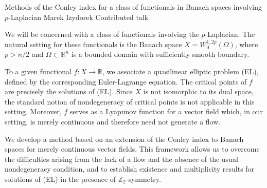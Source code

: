 \abstractheading
  {Methods of the Conley index for a class of functionals in Banach spaces involving \texorpdfstring{$p$}{p}-Laplacian}
  {Marek Izydorek}
  {\affilGdanskTech}
  {Contributed talk}

We will be concerned with a class of functionals involving the $p$-Laplacian.
The natural setting for these functionals is the Banach space
$X=W^{1,2p}_{0}(\Omega)$, where $p>n/2$ and
$\Omega\subset\mathbb{R}^{n}$ is a bounded domain with sufficiently smooth
boundary.

To a given functional $f:X\to\mathbb{R}$, we associate a quasilinear elliptic
problem (EL), defined by the corresponding Euler-Lagrange equation. The critical
points of $f$ are precisely the solutions of (EL). Since $X$ is not isomorphic
to its dual space, the standard notion of nondegeneracy of critical points is not
applicable in this setting. Moreover, $f$ serves as a Lyapunov function for a
vector field which, in our setting, is merely continuous and therefore need not
generate a flow.

We develop a method based on an extension of the Conley index to Banach spaces for
merely continuous vector fields. This framework allows us to overcome the
difficulties arising from the lack of a flow and the absence of the usual
nondegeneracy condition, and to establish existence and multiplicity results for
solutions of (EL) in the presence of $\mathbb{Z}_{2}$-symmetry.
